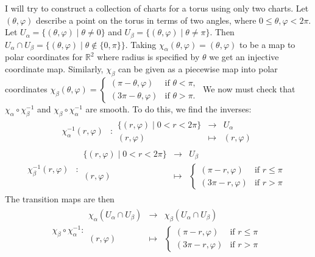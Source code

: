 \documentclass[a4paper]{article}
\newcommand{\R}{\mathbb{R}}
\begin{document}
I will try to construct a collection of charts for a torus using only two charts. Let $(\theta, \varphi)$ describe a point on the torus in terms of two angles, where $0 \leq \theta, \varphi < 2\pi$. Let $U_\alpha = \{(\theta, \varphi) \mid \theta \neq 0\}$ and $U_\beta = \{(\theta, \varphi) \mid \theta \neq \pi\}$. Then $U_\alpha \cap U_\beta = \{(\theta, \varphi) \mid \theta \notin \{0, \pi\}\}$. Taking $\chi_\alpha(\theta, \varphi) = (\theta, \varphi)$ to be a map to polar coordinates for $\R^2$ where radius is specified by $\theta$ we get an injective coordinate map. Similarly, $\chi_\beta$ can be given as a piecewise map into polar coordinates $\chi_\beta(\theta, \varphi) = \left\{ \begin{array}{ll} (\pi - \theta, \varphi) & \text{if } \theta < \pi, \\ (3\pi - \theta, \varphi) & \text{if } \theta > \pi. \end{array} \right.$ We now must check that $\chi_\alpha \circ \chi_\beta^{-1}$ and $\chi_\beta \circ \chi_\alpha^{-1}$ are smooth. To do this, we find the inverses:
\begin{align}
    \chi_\alpha^{-1}(r, \varphi) &: \begin{array}{rcl} \{(r, \varphi) \mid 0 < r < 2\pi\} & \to & U_\alpha \\ (r, \varphi) & \mapsto & (r, \varphi) \end{array}
\end{align}
\begin{align}
    \chi_\beta^{-1}(r, \varphi) &: \begin{array}{rcl} \{(r, \varphi) \mid 0 < r < 2\pi\} & \to & U_\beta \\ (r, \varphi) & \mapsto & \left\{ \begin{array}{ll} (\pi - r, \varphi) & \text{if } r \leq \pi \\ (3\pi - r, \varphi) & \text{if } r > \pi \end{array} \right. \end{array}
\end{align}
The transition maps are then
\begin{align}
    \chi_\beta \circ \chi_\alpha^{-1} : \begin{array}{rcl} \chi_\alpha(U_\alpha \cap U_\beta) & \to & \chi_\beta(U_\alpha \cap U_\beta) \\ (r, \varphi) & \mapsto & \left\{ \begin{array}{ll} (\pi - r, \varphi) & \text{if } r \leq \pi \\ (3\pi - r, \varphi) & \text{if } r > \pi \end{array} \right. \end{array}
\end{align}
\end{document}

